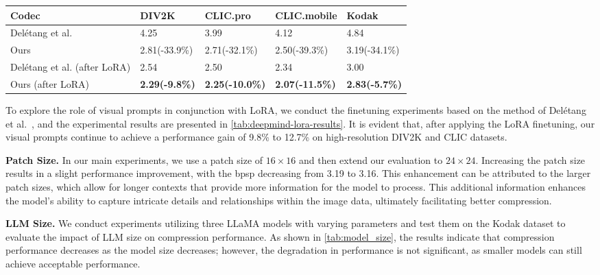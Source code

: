 \begin{table*}[t]
\tabcolsep=0.4cm
\begin{center}
\begin{tabular}{lllll}
\toprule[2pt]
Codec  &DIV2K &CLIC.pro &CLIC.mobile &Kodak\\
\midrule[1pt]
Del{\'e}tang et al.  &4.25 &3.99 &4.12 &4.84\\
Ours  &2.81(-33.9\%) &2.71(-32.1\%) &2.50(-39.3\%) &3.19(-34.1\%) \\
\midrule[1pt]
Del{\'e}tang et al. (after LoRA)  &2.54 &2.50 &2.34 &3.00\\
Ours (after LoRA)  &\bf2.29(-9.8\%) &\bf2.25(-10.0\%) &\bf2.07(-11.5\%) &\bf2.83(-5.7\%) \\
\bottomrule[2pt]
\end{tabular}
\caption{Performance comparision for Del{\'e}tang et al. (i.e., without visual prompts) and Ours (i.e., with visual prompts).}
\label{tab:deepmind-lora-results}
\end{center}
\end{table*}

To explore the role of visual prompts in conjunction with LoRA, we conduct the finetuning experiments based on the method of Del{\'e}tang et al.~\cite{deletang2023language}, and the experimental results are presented in \cref{tab:deepmind-lora-results}. It is evident that, after applying the LoRA finetuning, our visual prompts continue to achieve a performance gain of 9.8\% to 12.7\% on high-resolution DIV2K and CLIC datasets.

\textbf{Patch Size.} 
In our main experiments, we use a patch size of $16\times16$ and then extend our evaluation to $24\times24$. Increasing the patch size results in a slight performance improvement, with the bpsp decreasing from 3.19 to 3.16. 
This enhancement can be attributed to the larger patch sizes, which allow for longer contexts that provide more information for the model to process. This additional information enhances the model's ability to capture intricate details and relationships within the image data, ultimately facilitating better compression.

\textbf{LLM Size.}
We conduct experiments utilizing three LLaMA models with varying parameters and test them on the Kodak dataset to evaluate the impact of LLM size on compression performance. As shown in \cref{tab:model_size}, the results indicate that compression performance decreases as the model size decreases; however, the degradation in performance is not significant, as smaller models can still achieve acceptable performance. 

